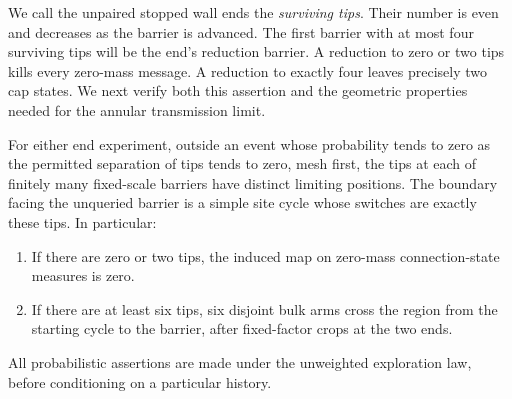 We call the unpaired stopped wall ends the \emph{surviving tips}.
Their number is even and decreases as the barrier is advanced.  The
first barrier with at most four surviving tips will be the end's
reduction barrier.  A reduction to zero or two tips kills every
zero-mass message.  A reduction to exactly four leaves precisely two
cap states.  We next verify both this assertion and the geometric
properties needed for the annular transmission limit.

\begin{lemma}
\label{tr:frontier}
For either end experiment, outside an event whose probability tends to
zero as the permitted separation of tips tends to zero, mesh first,
the tips at each of finitely many fixed-scale barriers have distinct
limiting positions.  The boundary facing the unqueried barrier is a
simple site cycle whose switches are exactly these tips.  In particular:
\begin{enumerate}
\item If there are zero or two tips, the induced map on zero-mass
connection-state measures is zero.
\item If there are at least six tips, six disjoint bulk arms cross the
region from the starting cycle to the barrier, after fixed-factor
crops at the two ends.
\end{enumerate}
All probabilistic assertions are made under the unweighted exploration
law, before conditioning on a particular history.
\end{lemma}

